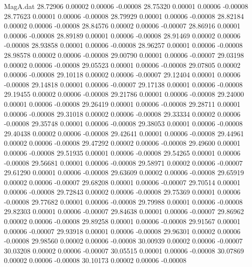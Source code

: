 \begin{filecontents}{MagA.dat}
  28.72906    0.00002    0.00006   -0.00008
  28.75320    0.00001    0.00006   -0.00008
  28.77623    0.00001    0.00006   -0.00008
  28.79929    0.00001    0.00006   -0.00008
  28.82184    0.00002    0.00006   -0.00008
  28.84576    0.00002    0.00006   -0.00007
  28.86916    0.00001    0.00006   -0.00008
  28.89189    0.00001    0.00006   -0.00008
  28.91469    0.00002    0.00006   -0.00008
  28.93858    0.00001    0.00006   -0.00008
  28.96257    0.00001    0.00006   -0.00008
  28.98578    0.00002    0.00006   -0.00008
  29.00790    0.00001    0.00006   -0.00007
  29.03198    0.00002    0.00006   -0.00008
  29.05523    0.00001    0.00006   -0.00008
  29.07805    0.00002    0.00006   -0.00008
  29.10118    0.00002    0.00006   -0.00007
  29.12404    0.00001    0.00006   -0.00008
  29.14818    0.00001    0.00006   -0.00007
  29.17138    0.00001    0.00006   -0.00008
  29.19455    0.00002    0.00006   -0.00008
  29.21786    0.00001    0.00006   -0.00008
  29.24000    0.00001    0.00006   -0.00008
  29.26419    0.00001    0.00006   -0.00008
  29.28711    0.00001    0.00006   -0.00008
  29.31018    0.00002    0.00006   -0.00008
  29.33334    0.00002    0.00006   -0.00008
  29.35748    0.00001    0.00006   -0.00008
  29.38053    0.00001    0.00006   -0.00008
  29.40438    0.00002    0.00006   -0.00008
  29.42641    0.00001    0.00006   -0.00008
  29.44961    0.00002    0.00006   -0.00008
  29.47292    0.00002    0.00006   -0.00008
  29.49600    0.00001    0.00006   -0.00008
  29.51935    0.00001    0.00006   -0.00008
  29.54265    0.00001    0.00006   -0.00008
  29.56681    0.00001    0.00006   -0.00008
  29.58971    0.00002    0.00006   -0.00007
  29.61290    0.00001    0.00006   -0.00008
  29.63609    0.00002    0.00006   -0.00008
  29.65919    0.00002    0.00006   -0.00007
  29.68208    0.00001    0.00006   -0.00007
  29.70514    0.00001    0.00006   -0.00008
  29.72843    0.00002    0.00006   -0.00008
  29.75369    0.00001    0.00006   -0.00008
  29.77682    0.00001    0.00006   -0.00008
  29.79988    0.00001    0.00006   -0.00008
  29.82303    0.00001    0.00006   -0.00007
  29.84638    0.00001    0.00006   -0.00007
  29.86962    0.00002    0.00006   -0.00008
  29.89258    0.00001    0.00006   -0.00008
  29.91567    0.00001    0.00006   -0.00007
  29.93918    0.00001    0.00006   -0.00008
  29.96301    0.00002    0.00006   -0.00008
  29.98560    0.00002    0.00006   -0.00008
  30.00939    0.00002    0.00006   -0.00007
  30.03208    0.00002    0.00006   -0.00007
  30.05515    0.00001    0.00006   -0.00008
  30.07869    0.00002    0.00006   -0.00008
  30.10173    0.00002    0.00006   -0.00008

\end{filecontents}
